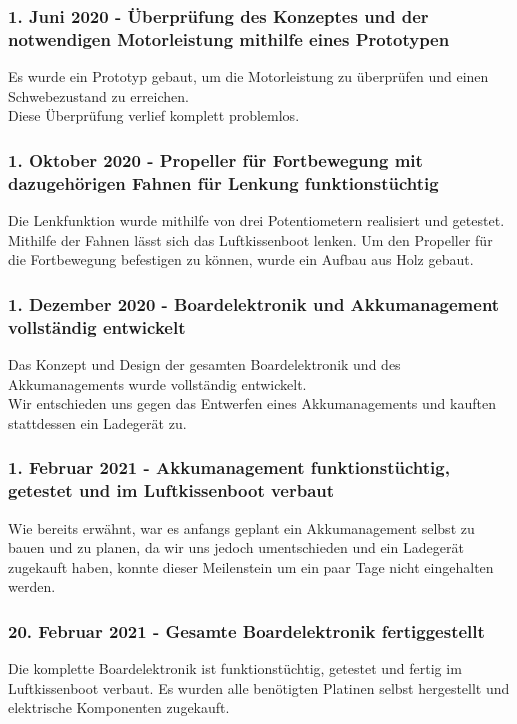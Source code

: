 \subsubsection*{1. Juni 2020 - Überprüfung des Konzeptes und der notwendigen Motorleistung mithilfe eines Prototypen}
Es wurde ein Prototyp gebaut, um die Motorleistung zu überprüfen und einen Schwebezustand zu erreichen. \\
Diese Überprüfung verlief komplett problemlos.  \\

\subsubsection*{1. Oktober 2020 - Propeller für Fortbewegung mit dazugehörigen Fahnen für Lenkung funktionstüchtig}
Die Lenkfunktion wurde mithilfe von drei Potentiometern realisiert und getestet. Mithilfe der Fahnen lässt sich das Luftkissenboot lenken. Um den Propeller für 
die Fortbewegung befestigen zu können, wurde ein Aufbau aus Holz gebaut.  \\

\subsubsection*{1. Dezember 2020 - Boardelektronik und  Akkumanagement vollständig entwickelt}
Das Konzept und Design der gesamten Boardelektronik und des Akkumanagements wurde  vollständig entwickelt. \\
Wir entschieden uns gegen das Entwerfen eines Akkumanagements und kauften stattdessen ein Ladegerät zu.\\

\subsubsection*{1. Februar 2021 - Akkumanagement funktionstüchtig, getestet und im Luftkissenboot verbaut}
Wie bereits erwähnt, war es anfangs geplant ein Akkumanagement selbst zu bauen und zu planen, da wir uns jedoch umentschieden und ein Ladegerät zugekauft haben, konnte dieser Meilenstein um ein paar Tage 
nicht eingehalten werden. \\


\subsubsection*{20. Februar 2021 - Gesamte Boardelektronik fertiggestellt}
Die komplette Boardelektronik ist funktionstüchtig, getestet und fertig im Luftkissenboot verbaut. Es wurden alle benötigten Platinen selbst hergestellt
und elektrische Komponenten zugekauft. 

